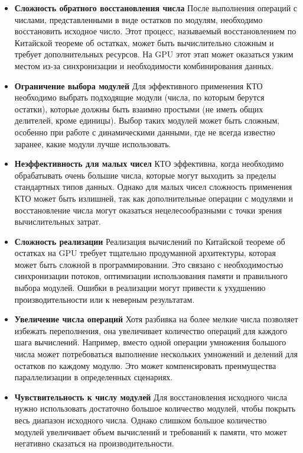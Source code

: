 \documentclass[10pt]{article}
\begin{document}
\begin{itemize}
	\item  \textbf{Сложность обратного восстановления числа}
	После выполнения операций с числами, представленными в виде остатков по модулям, необходимо восстановить исходное число. Этот процесс, называемый восстановлением по Китайской теореме об остатках, может быть вычислительно сложным и требует дополнительных ресурсов. На GPU этот этап может оказаться узким местом из-за синхронизации и необходимости комбинирования данных.
	
	\item \textbf{Ограничение выбора модулей}
	Для эффективного применения КТО необходимо выбрать подходящие модули (числа, по которым берутся остатки), которые должны быть взаимно простыми (не иметь общих делителей, кроме единицы). Выбор таких модулей может быть сложным, особенно при работе с динамическими данными, где не всегда известно заранее, какие модули лучше использовать.
		
	\item \textbf{Неэффективность для малых чисел}
	КТО эффективна, когда необходимо обрабатывать очень большие числа, которые могут выходить за пределы стандартных типов данных. Однако для малых чисел сложность применения КТО может быть излишней, так как дополнительные операции с модулями и восстановление числа могут оказаться нецелесообразными с точки зрения вычислительных затрат.
	
	\item \textbf{Сложность реализации}
	Реализация вычислений по Китайской теореме об остатках на GPU требует тщательно продуманной архитектуры, которая может быть сложной в программировании. Это связано с необходимостью синхронизации потоков, оптимизации использования памяти и правильного выбора модулей. Ошибки в реализации могут привести к ухудшению производительности или к неверным результатам.
	
	\item \textbf{Увеличение числа операций}
	Хотя разбивка на более мелкие числа позволяет избежать переполнения, она увеличивает количество операций для каждого шага вычислений. Например, вместо одной операции умножения большого числа может потребоваться выполнение нескольких умножений и делений для остатков по каждому модулю. Это может компенсировать преимущества параллелизации в определенных сценариях.
	
	\item \textbf{Чувствительность к числу модулей}
	Для восстановления исходного числа нужно использовать достаточно большое количество модулей, чтобы покрыть весь диапазон исходного числа. Однако слишком большое количество модулей увеличивает объем вычислений и требований к памяти, что может негативно сказаться на производительности.
\end{itemize}
\end{document}
